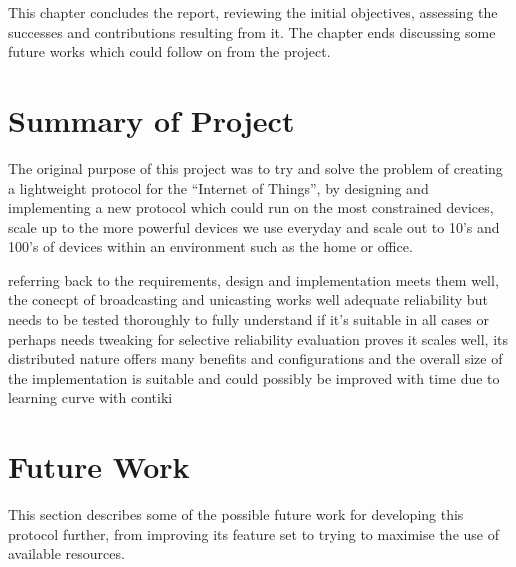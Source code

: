 This chapter concludes the report, reviewing the initial objectives, assessing the successes and contributions resulting from it.
The chapter ends discussing some future works which could follow on from the project.

\section{Summary of Project}
The original purpose of this project was to try and solve the problem of creating a lightweight protocol for the ``Internet of Things'', by designing and implementing a new protocol which could run on the most constrained devices, scale up to the more powerful devices we use everyday and scale out to 10's and 100's of devices within an environment such as the home or office.

referring back to the requirements, design and implementation meets them well,
the conecpt of broadcasting and unicasting works well
adequate reliability but needs to be tested thoroughly to fully understand if it's suitable in all cases or perhaps needs tweaking for selective reliability
evaluation proves it scales well, its distributed nature offers many benefits and configurations and the overall size of the implementation is suitable and could possibly be improved with time due to learning curve with contiki

\section{Future Work}
This section describes some of the possible future work for developing this protocol further, from improving its feature set to trying to maximise the use of available resources.

